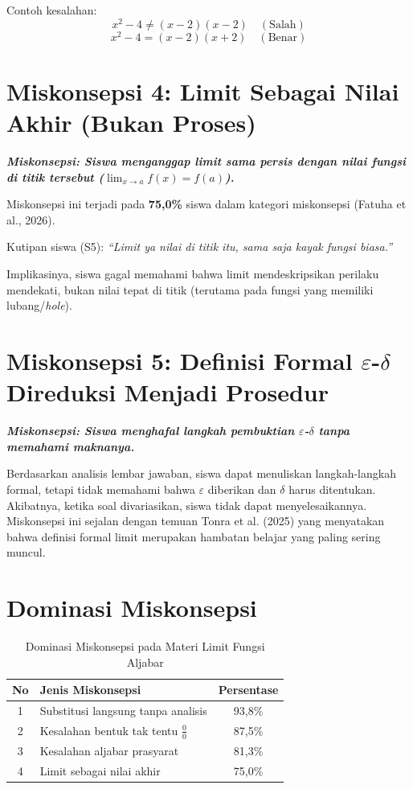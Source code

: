 \documentclass[12pt,a4paper,openany]{book}
\theoremstyle{definition}
\newcommand{\miskonsepsi}[1]{\textbf{\textit{Miskonsepsi: #1}}}
\begin{document}
Contoh kesalahan:
\[
x^2 - 4 \neq (x - 2)(x - 2) \quad (\text{Salah})
\]
\[
x^2 - 4 = (x - 2)(x + 2) \quad (\text{Benar})
\]

\section{Miskonsepsi 4: Limit Sebagai Nilai Akhir (Bukan Proses)}

\miskonsepsi{Siswa menganggap limit sama persis dengan nilai fungsi di titik tersebut ($\lim_{x \to a} f(x) = f(a)$).}

Miskonsepsi ini terjadi pada \textbf{75,0\%} siswa dalam kategori miskonsepsi (Fatuha et al., 2026).

Kutipan siswa (S5): \textit{``Limit ya nilai di titik itu, sama saja kayak fungsi biasa.''}

Implikasinya, siswa gagal memahami bahwa limit mendeskripsikan perilaku mendekati, bukan nilai tepat di titik (terutama pada fungsi yang memiliki lubang/\textit{hole}).

\section{Miskonsepsi 5: Definisi Formal $\varepsilon$-$\delta$ Direduksi Menjadi Prosedur}

\miskonsepsi{Siswa menghafal langkah pembuktian $\varepsilon$-$\delta$ tanpa memahami maknanya.}

Berdasarkan analisis lembar jawaban, siswa dapat menuliskan langkah-langkah formal, tetapi tidak memahami bahwa $\varepsilon$ diberikan dan $\delta$ harus ditentukan. Akibatnya, ketika soal divariasikan, siswa tidak dapat menyelesaikannya. Miskonsepsi ini sejalan dengan temuan Tonra et al. (2025) yang menyatakan bahwa definisi formal limit merupakan hambatan belajar yang paling sering muncul.

\section{Dominasi Miskonsepsi}

\begin{table}[h]
\centering
\caption{Dominasi Miskonsepsi pada Materi Limit Fungsi Aljabar}
\label{tab:dominasi}
\begin{tabular}{@{}clc@{}}
\toprule
\textbf{No} & \textbf{Jenis Miskonsepsi} & \textbf{Persentase} \\
\midrule
1 & Substitusi langsung tanpa analisis & 93,8\% \\
2 & Kesalahan bentuk tak tentu $\frac{0}{0}$ & 87,5\% \\
3 & Kesalahan aljabar prasyarat & 81,3\% \\
4 & Limit sebagai nilai akhir & 75,0\% \\
\bottomrule
\end{tabular}
\end{table}
\end{document}
